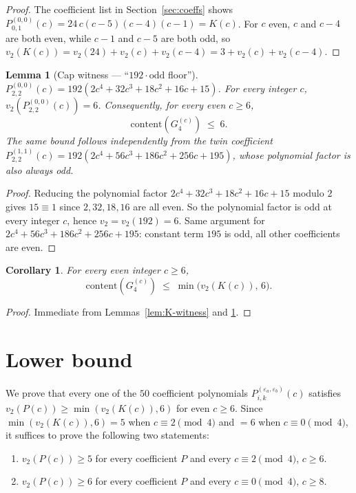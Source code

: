 \documentclass[11pt]{article}
\newtheorem{lemma}[theorem]{Lemma}
\newtheorem{corollary}[theorem]{Corollary}
\begin{document}
\begin{proof}
The coefficient list in Section~\ref{sec:coeffs} shows $P^{(0,0)}_{0,1}(c) = 24\,c(c-5)(c-4)(c-1) = K(c)$.
For $c$ even, $c$ and $c-4$ are both even, while $c-1$ and $c-5$ are both odd, so
$v_2(K(c)) = v_2(24) + v_2(c) + v_2(c-4) = 3 + v_2(c) + v_2(c-4)$.
\end{proof}

\begin{lemma}[Cap witness --- ``$192\cdot\mathrm{odd}$ floor'']\label{lem:cap-witness}
$P^{(0,0)}_{2,2}(c) = 192(2c^4 + 32c^3 + 18c^2 + 16c + 15)$. For \emph{every} integer $c$,
$v_2(P^{(0,0)}_{2,2}(c)) = 6$. Consequently, for every even $c \ge 6$,
\[
  \mathrm{content}(G_4^{(c)}) \;\le\; 6.
\]
The same bound follows independently from the twin coefficient
$P^{(1,1)}_{2,2}(c) = 192(2c^4 + 56c^3 + 186c^2 + 256c + 195)$, whose polynomial factor is
also always odd.
\end{lemma}

\begin{proof}
Reducing the polynomial factor $2c^4 + 32c^3 + 18c^2 + 16c + 15$ modulo $2$ gives $15 \equiv 1$
since $2, 32, 18, 16$ are all even. So the polynomial factor is odd at every integer $c$,
hence $v_2 = v_2(192) = 6$. Same argument for $2c^4 + 56c^3 + 186c^2 + 256c + 195$: constant
term $195$ is odd, all other coefficients are even.
\end{proof}

\begin{corollary}\label{cor:upper}
For every even integer $c \ge 6$,
\[
  \mathrm{content}(G_4^{(c)}) \;\le\; \min\bigl(v_2(K(c)),\, 6\bigr).
\]
\end{corollary}

\begin{proof}
Immediate from Lemmas~\ref{lem:K-witness} and \ref{lem:cap-witness}.
\end{proof}

\section{Lower bound}\label{sec:lower}

We prove that every one of the $50$ coefficient polynomials
$P^{(\varepsilon_a, \varepsilon_b)}_{i,k}(c)$ satisfies
$v_2(P(c)) \ge \min(v_2(K(c)), 6)$ for even $c \ge 6$. Since $\min(v_2(K(c)), 6) = 5$ when
$c \equiv 2 \pmod 4$ and $= 6$ when $c \equiv 0 \pmod 4$, it suffices to prove the following
two statements:
\begin{enumerate}
  \item[(L1)] $v_2(P(c)) \ge 5$ for every coefficient $P$ and every $c \equiv 2 \pmod 4$, $c \ge 6$.
  \item[(L2)] $v_2(P(c)) \ge 6$ for every coefficient $P$ and every $c \equiv 0 \pmod 4$, $c \ge 8$.
\end{enumerate}
\end{document}
